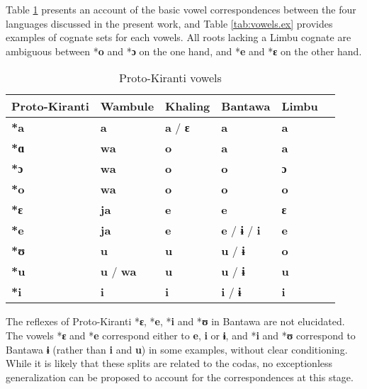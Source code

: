 \documentclass[oldfontcommands,oneside,a4paper,11pt]{article}
\newcommand{\ipa}[1]{\textbf{{\phon\mbox{#1}}}} %
\begin{document}
Table \ref{tab:vowels} presents an account of the basic vowel correspondences between the four languages discussed in the present work, and Table \ref{tab:vowels.ex} provides examples of cognate sets for each vowels. All roots lacking a Limbu cognate are ambiguous between *\ipa{o} and *\ipa{ɔ} on the one hand, and *\ipa{e} and *\ipa{ɛ} on the other hand.



\begin{table}[H]
\caption{Proto-Kiranti vowels} \centering \label{tab:vowels}
\begin{tabular}{llllll}
\toprule
Proto-Kiranti & Wambule & Khaling & Bantawa & Limbu \\
\midrule
\ipa{*a} & \ipa{a} & \ipa{a}  / \ipa{ɛ} & \ipa{a} & \ipa{a}  \\
\ipa{*ɑ} & \ipa{wa} & \ipa{o} & \ipa{a} & \ipa{a}  \\
\ipa{*ɔ} & \ipa{wa} & \ipa{o} & \ipa{o} & \ipa{ɔ}  \\
\ipa{*o} & \ipa{wa} & \ipa{o} & \ipa{o} & \ipa{o}  \\
\ipa{*ɛ} & \ipa{ja} & \ipa{e} & \ipa{e}  & \ipa{ɛ}  \\
\ipa{*e} & \ipa{ja} & \ipa{e} & \ipa{e}  / \ipa{ɨ} / \ipa{i} & \ipa{e}    \\
\ipa{*ʊ} & \ipa{u} & \ipa{u} & \ipa{u}  /  \ipa{ɨ}  & \ipa{o} \\
\ipa{*u} & \ipa{u} / \ipa{wa} & \ipa{u} & \ipa{u} /  \ipa{ɨ} \  & \ipa{u} \\
\ipa{*i} & \ipa{i} & \ipa{i} & \ipa{i}  / \ipa{ɨ} & \ipa{i}  \\
\bottomrule
\end{tabular}
\end{table}

The reflexes of Proto-Kiranti *\ipa{ɛ}, *\ipa{e}, *\ipa{i} and *\ipa{ʊ} in Bantawa are not elucidated. The vowels *\ipa{ɛ} and *\ipa{e} correspond either to \ipa{e}, \ipa{i} or \ipa{ɨ}, and *\ipa{i} and *\ipa{ʊ} correspond to Bantawa \ipa{ɨ} (rather than \ipa{i} and \ipa{u}) in some examples, without clear conditioning. While it is likely that these splits are related to the codas, no exceptionless generalization can be proposed to account for the correspondences at this stage.
 
\end{document}
